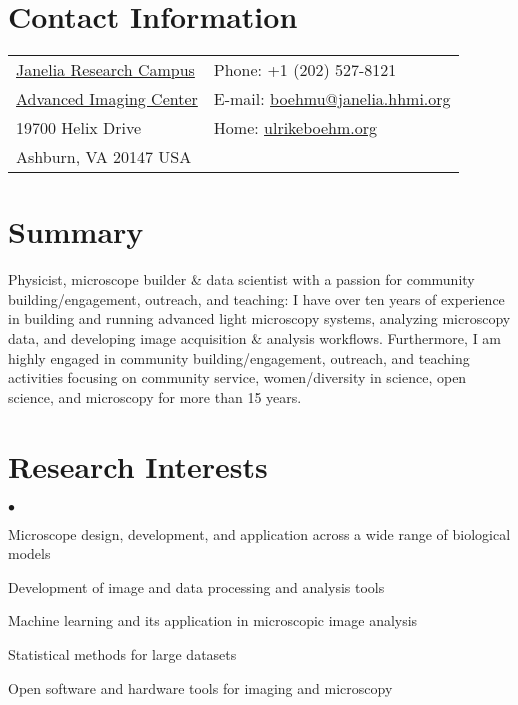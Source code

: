 \documentclass[margin,line]{res}
\newenvironment{list2}{
  \begin{list}{$\bullet$}{%
      \setlength{\itemsep}{0in}
      \setlength{\parsep}{0in} \setlength{\parskip}{0in}
      \setlength{\topsep}{0in} \setlength{\partopsep}{0in} 
      \setlength{\leftmargin}{0.2in}}}{\end{list}}
\begin{document}


\begin{resume}


\section{\sc Contact Information}
\vspace{.05in}
\begin{tabular}{@{}p{3.5in}p{4in}}
 \href{https://www.janelia.org/}{Janelia Research Campus}     & {Phone:} +1 (202) 527-8121 \\            
 \href{https://www.aicjanelia.org/}{Advanced Imaging Center}   & { E-mail:}   \href{mailto:boehmu@janelia.hhmi.org}{boehmu@janelia.hhmi.org}  \\         
19700 Helix Drive & { Home:}  \href{http://ulrikeboehm.org/}{ulrikeboehm.org}\\       
Ashburn, VA  20147 USA  &  \\     
\end{tabular}


\section{\sc Summary}
Physicist, microscope builder \& data scientist with a passion for community building/engagement, outreach, and teaching: I have over ten years of experience in building and running advanced light microscopy systems, analyzing microscopy data, and developing image acquisition \& analysis workflows. Furthermore, I am highly engaged in community building/engagement, outreach, and teaching activities focusing on community service, women/diversity in science, open science, and microscopy for more than 15 years.


\section{\sc Research Interests}
\begin{list2}
\item Microscope design, development, and application across a wide range of biological models 
\item Development of image and data processing and analysis tools
\item Machine learning and its application in microscopic image analysis
\item Statistical methods for large datasets
\item Open software and hardware tools for imaging and microscopy
\end{list2}


\end{resume}
\end{document}

